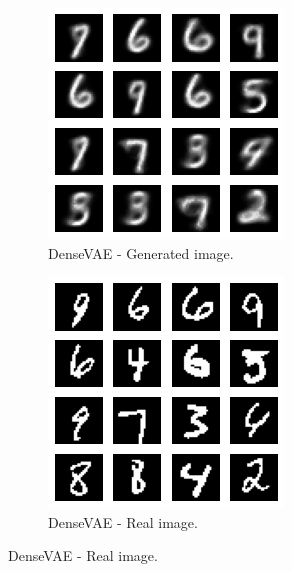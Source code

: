 \documentclass{article}
\begin{document}
	\begin{figure}[htbp]
		\centering
		\begin{subfigure}[t]{0.48\textwidth}
			\centering
			\includegraphics[scale=0.45]{VAE_Dense_GenImage.png}
			\caption{DenseVAE - Generated image.}
			\label{fig:VAEImage_1}
		\end{subfigure}
		\begin{subfigure}[t]{0.48\textwidth}
			\centering
			\includegraphics[scale=0.45]{VAE_Dense_RealImage.png}
			\caption{DenseVAE - Real image.}
			\label{fig:VAERealImage_1}
		\end{subfigure}
	

\end{figure}
\end{document}
